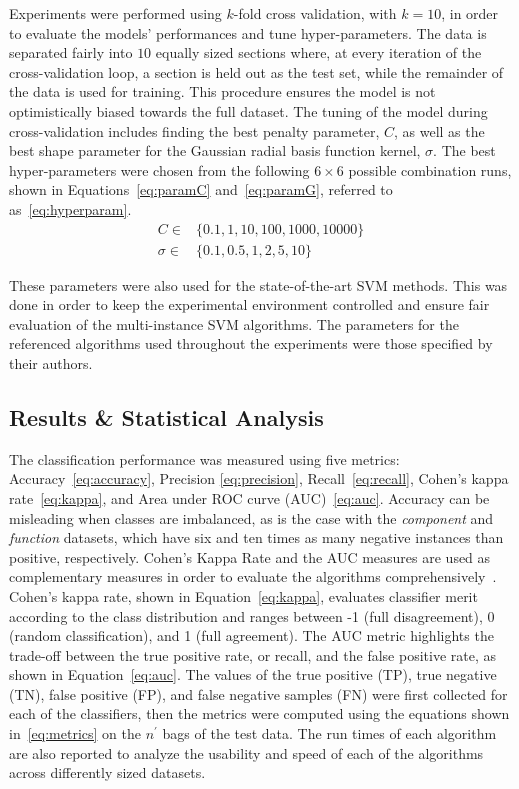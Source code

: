 \documentclass[preprint,12pt]{elsarticle}
\begin{document}
Experiments were performed using $k$-fold cross validation, with $k = 10$, in order to evaluate the models' performances and tune hyper-parameters. The data is separated fairly into $10$ equally sized sections where, at every iteration of the cross-validation loop, a section is held out as the test set, while the remainder of the data is used for training. This procedure ensures the model is not optimistically biased towards the full dataset. The tuning of the model during cross-validation includes finding the best penalty parameter, $C$, as well as the best shape parameter for the Gaussian radial basis function kernel, $\sigma$. The best hyper-parameters were chosen from the following $6 \times 6$ possible combination runs, shown in Equations~\eqref{eq:paramC} and~\eqref{eq:paramG}, referred to as~\eqref{eq:hyperparam}. 
\begin{subequations}
\label{eq:hyperparam}
\begin{align}
C \in  & \{0.1, 1, 10, 100, 1000, 10000\} \label{eq:paramC}\\
\sigma \in  & \{0.1, 0.5, 1, 2, 5, 10\} \label{eq:paramG}
\end{align}
\end{subequations}

These parameters were also used for the state-of-the-art SVM methods. This was done in order to keep the experimental environment controlled and ensure fair evaluation of the multi-instance SVM algorithms. The parameters for the referenced algorithms used throughout the experiments were those specified by their authors.

\subsection{Results \& Statistical Analysis}\label{subsec:results}
The classification performance was measured using five metrics: Accuracy~\eqref{eq:accuracy}, Precision \eqref{eq:precision}, Recall~\eqref{eq:recall}, Cohen's kappa rate~\eqref{eq:kappa}, and Area under ROC curve (AUC)~\eqref{eq:auc}. Accuracy can be misleading when classes are imbalanced, as is the case with the \textit{component} and \textit{function} datasets, which have six and ten times as many negative instances than positive, respectively. Cohen's Kappa Rate and the AUC measures are used as complementary measures in order to evaluate the algorithms comprehensively~\citep{Bendavid2008}. Cohen's kappa rate, shown in Equation~\eqref{eq:kappa}, evaluates classifier merit according to the class distribution and ranges between -1 (full disagreement), 0 (random classification), and 1 (full agreement). The AUC metric highlights the trade-off between the true positive rate, or recall, and the false positive rate, as shown in Equation~\eqref{eq:auc}. The values of the true positive (TP), true negative (TN), false positive (FP), and false negative samples (FN) were first collected for each of the classifiers, then the metrics were computed using the equations shown in~\eqref{eq:metrics} on the $n^\prime$ bags of the test data. The run times of each algorithm are also reported to analyze the usability and speed of each of the algorithms across differently sized datasets. 
\end{document}
